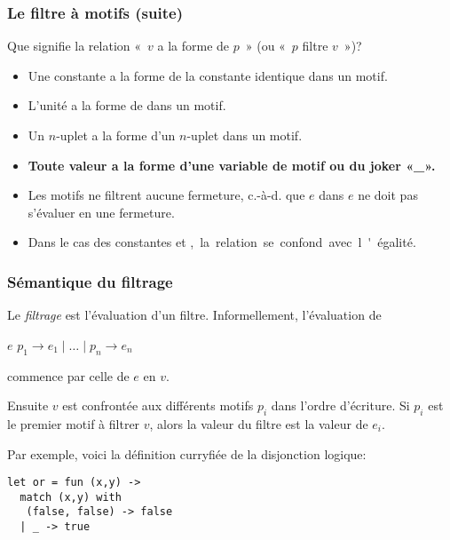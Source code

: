 %
\begin{frame}
\frametitle{Le filtre à motifs (suite)} 

Que signifie la relation «~$v$ a la forme de $p$~» (ou «~$p$ filtre
$v$~»)?
\begin{itemize}

  \item Une constante a la forme de la constante identique dans un
  motif.

  \item L'unité \unit{} a la forme de \unit{} dans un motif.

  \item Un $n$-uplet a la forme d'un $n$-uplet dans un motif.

  \item \textbf{Toute valeur a la forme d'une variable de motif ou du
  joker «{\Large \_}».}

\end{itemize}

\bigskip

\remarques 

\begin{itemize}

  \item Les motifs ne filtrent aucune fermeture, c.-à-d. que $e$ dans
    \Xmatch{} $e$ \Xwith{} ne doit pas s'évaluer en une fermeture.

  \item Dans le cas des constantes et \unit, la relation se confond
  avec l'égalité.

\end{itemize}

\end{frame}

%
\begin{frame}[containsverbatim]
\frametitle{Sémantique du filtrage}

Le \emph{filtrage} est l'évaluation d'un filtre. Informellement,
l'évaluation de
 
\centerline{\Xmatch{} $e$ \Xwith{} $p_1 \rightarrow e_1 \mid \ldots
  \mid p_n \rightarrow e_n$} commence par celle de $e$ en $v$.

\bigskip

Ensuite $v$ est confrontée aux différents motifs $p_i$ dans l'ordre
d'écriture. Si $p_i$ est le premier motif à filtrer $v$, alors la
valeur du filtre est la valeur de $e_i$.

\bigskip

Par exemple, voici la définition curryfiée de la disjonction logique:
{\small
\begin{verbatim}
let or = fun (x,y) ->
  match (x,y) with
   (false, false) -> false
  | _ -> true
\end{verbatim}
}

\end{frame}

